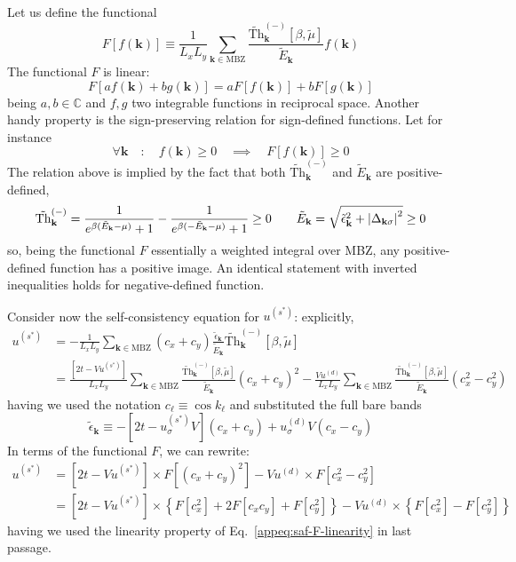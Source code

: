 Let us define the functional
\begin{equation}\label{appeq:saf-F-definition}
	F[f(\mathbf{k})] \equiv \frac{1}{L_x L_y} \sum_{\mathbf{k}\in\mathrm{MBZ}} \frac{\tilde{\mathrm{Th}}_\mathbf{k}^{(-)}[\beta,\tilde{\mu}]}{\tilde{E}_\mathbf{k}} f(\mathbf{k})
\end{equation}
The functional $F$ is linear:
\begin{equation}\label{appeq:saf-F-linearity}
	F[a f(\mathbf{k}) + b g(\mathbf{k})] = a F[f(\mathbf{k})] + b F[g(\mathbf{k})]
\end{equation}
being $a,b \in \mathbb{C}$ and $f,g$ two integrable functions in reciprocal space. Another handy property is the sign-preserving relation for sign-defined functions. Let for instance
\begin{equation}\label{appeq:saf-F-positivity}
	\forall \mathbf{k} \quad\colon\quad f(\mathbf{k}) \ge 0 
	\quad\implies\quad F[f(\mathbf{k})] \ge 0
\end{equation}
The relation above is implied by the fact that both $\tilde{\mathrm{Th}}_\mathbf{k}^{(-)}$ and $\tilde{E}_\mathbf{k}$ are positive-defined,
\[
\tilde{\mathrm{Th}}_\mathbf{k}^{(-)} = \frac{1}{e^{\beta(\tilde{E}_\mathbf{k}-\mu)}+1} - \frac{1}{e^{\beta(-\tilde{E}_\mathbf{k}-\mu)}+1} \ge 0
\qquad
\tilde{E}_\mathbf{k} = \sqrt{\tilde{\epsilon}_\mathbf{k}^2 + \abs{\Delta_{\mathbf{k}\sigma}}^2} \ge 0
\]
so, being the functional $F$ essentially a weighted integral over MBZ, any positive-defined function has a positive image. An identical statement with inverted inequalities holds for negative-defined function.

Consider now the self-consistency equation for $u^{(s^*)}$: explicitly,
\[
\begin{aligned}
	u^{(s^*)} &= -\frac{1}{L_x L_y} \sum_{\mathbf{k}\in\mathrm{MBZ}} (c_x + c_y)
	\frac{\tilde{\epsilon}_\mathbf{k}}{\tilde{E}_\mathbf{k}} \tilde{\mathrm{Th}}_\mathbf{k}^{(-)}[\beta,\tilde{\mu}] \\
	&= \frac{\left[2t - Vu^{(s^*)}\right]}{L_x L_y} \sum_{\mathbf{k}\in\mathrm{MBZ}}
	\frac{ \tilde{\mathrm{Th}}_\mathbf{k}^{(-)}[\beta,\tilde{\mu}]}{\tilde{E}_\mathbf{k}} (c_x + c_y)^2 - \frac{Vu^{(d)}}{L_x L_y} \sum_{\mathbf{k}\in\mathrm{MBZ}}
	\frac{ \tilde{\mathrm{Th}}_\mathbf{k}^{(-)}[\beta,\tilde{\mu}]}{\tilde{E}_\mathbf{k}} (c_x^2 - c_y^2)
\end{aligned}
\]
having we used the notation $c_\ell \equiv \cos k_\ell$ and substituted the full bare bands
\[
\tilde{\epsilon}_\mathbf{k} \equiv -\left[2t - u^{(s^*)}_\sigma V\right] (c_x + c_y) + u^{(d)}_\sigma V (c_x - c_y)
\]
In terms of the functional $F$, we can rewrite:
\[
\begin{aligned}
	u^{(s^*)} &= \left[2t - Vu^{(s^*)}\right] \times F\left[(c_x + c_y)^2\right] - Vu^{(d)} \times F\left[c_x^2 - c_y^2\right] \\
	&= \left[2t - Vu^{(s^*)}\right] \times \left\lbrace F\left[c_x^2\right] + 2F\left[c_x c_y\right] + F\left[c_y^2\right] \right\rbrace -  Vu^{(d)} \times \left\lbrace F\left[c_x^2\right] - F\left[c_y^2\right] \right\rbrace
\end{aligned}
\]
having we used the linearity property of Eq.~\eqref{appeq:saf-F-linearity} in last passage.


